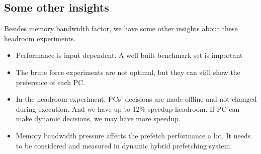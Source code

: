   \subsection{Some other insights}
  \label{sec:otherinsights}
  Besides memory bandwidth factor, we have some other insights about these headroom experiments.
  \begin{itemize}
    \item Performance is input dependent. A well built benchmark set is important
    \item The brute force experiments are not optimal, but they can still show the preference of each PC.
    \item In the headroom experiment, PCs’ decisions are made offline and not changed during execution. And we have up to 12\% speedup headroom. If PC can make dynamic decisions, we may have more speedup.
    \item Memory bandwidth pressure affects the prefetch performance a lot. It needs to be considered and measured in dynamic hybrid prefetching system.
  \end{itemize}
